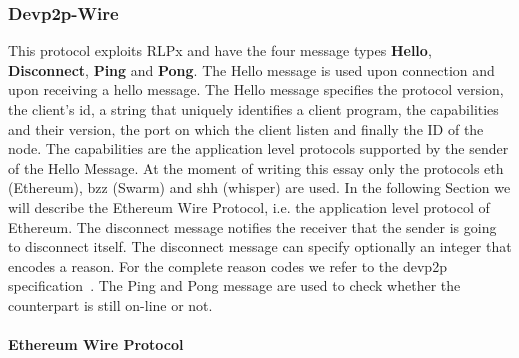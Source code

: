 \subsubsection{Devp2p-Wire}
This protocol exploits RLPx and have the four message types
\textbf{Hello}, \textbf{Disconnect}, \textbf{Ping} and \textbf{Pong}.
The Hello message is used upon connection and upon receiving a hello message.
The Hello message specifies the protocol version, the client's id,
a string that uniquely identifies a client program, the capabilities and their
version, the port on which the client listen and finally the ID of the node.
The capabilities are the application level protocols supported by the sender
of the Hello Message. At the moment of writing this essay only the protocols
eth (Ethereum), bzz (Swarm) and shh (whisper) are used. In the following
Section we will describe the Ethereum Wire Protocol, i.e. the application
level protocol of Ethereum.
The disconnect message notifies the receiver that the sender is going to
disconnect itself. The disconnect message can specify optionally an
integer that encodes a reason.
For the complete reason codes we refer to the devp2p specification~\cite{}.
The Ping and Pong message are used to check whether the counterpart is still
on-line or not.

\paragraph{Ethereum Wire Protocol}
